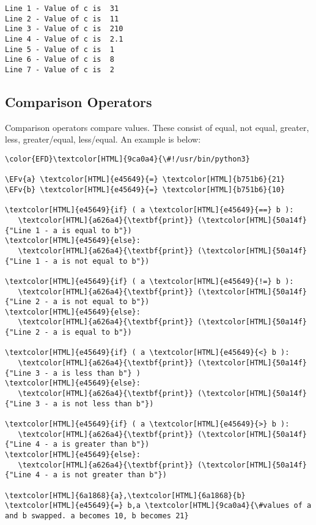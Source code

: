 \documentclass{scrartcl}
\newcommand{\EFv}[1]{\textcolor{EFv}{#1}} %
\begin{document}
\begin{verbatim}
Line 1 - Value of c is  31
Line 2 - Value of c is  11
Line 3 - Value of c is  210
Line 4 - Value of c is  2.1
Line 5 - Value of c is  1
Line 6 - Value of c is  8
Line 7 - Value of c is  2
\end{verbatim}

\subsection{Comparison Operators}
\label{sec:org7165f22}
Comparison operators compare values. These consist of equal, not equal, greater,
less, greater/equal, less/equal. An example is below:

\begin{Code}
\begin{Verbatim}[]
\color{EFD}\textcolor[HTML]{9ca0a4}{\#!/usr/bin/python3}

\EFv{a} \textcolor[HTML]{e45649}{=} \textcolor[HTML]{b751b6}{21}
\EFv{b} \textcolor[HTML]{e45649}{=} \textcolor[HTML]{b751b6}{10}

\textcolor[HTML]{e45649}{if} ( a \textcolor[HTML]{e45649}{==} b ):
   \textcolor[HTML]{a626a4}{\textbf{print}} (\textcolor[HTML]{50a14f}{"Line 1 - a is equal to b"})
\textcolor[HTML]{e45649}{else}:
   \textcolor[HTML]{a626a4}{\textbf{print}} (\textcolor[HTML]{50a14f}{"Line 1 - a is not equal to b"})

\textcolor[HTML]{e45649}{if} ( a \textcolor[HTML]{e45649}{!=} b ):
   \textcolor[HTML]{a626a4}{\textbf{print}} (\textcolor[HTML]{50a14f}{"Line 2 - a is not equal to b"})
\textcolor[HTML]{e45649}{else}:
   \textcolor[HTML]{a626a4}{\textbf{print}} (\textcolor[HTML]{50a14f}{"Line 2 - a is equal to b"})

\textcolor[HTML]{e45649}{if} ( a \textcolor[HTML]{e45649}{<} b ):
   \textcolor[HTML]{a626a4}{\textbf{print}} (\textcolor[HTML]{50a14f}{"Line 3 - a is less than b"} )
\textcolor[HTML]{e45649}{else}:
   \textcolor[HTML]{a626a4}{\textbf{print}} (\textcolor[HTML]{50a14f}{"Line 3 - a is not less than b"})

\textcolor[HTML]{e45649}{if} ( a \textcolor[HTML]{e45649}{>} b ):
   \textcolor[HTML]{a626a4}{\textbf{print}} (\textcolor[HTML]{50a14f}{"Line 4 - a is greater than b"})
\textcolor[HTML]{e45649}{else}:
   \textcolor[HTML]{a626a4}{\textbf{print}} (\textcolor[HTML]{50a14f}{"Line 4 - a is not greater than b"})

\textcolor[HTML]{6a1868}{a},\textcolor[HTML]{6a1868}{b} \textcolor[HTML]{e45649}{=} b,a \textcolor[HTML]{9ca0a4}{\#values of a and b swapped. a becomes 10, b becomes 21}


\end{Verbatim}
\end{Code}
\end{document}

